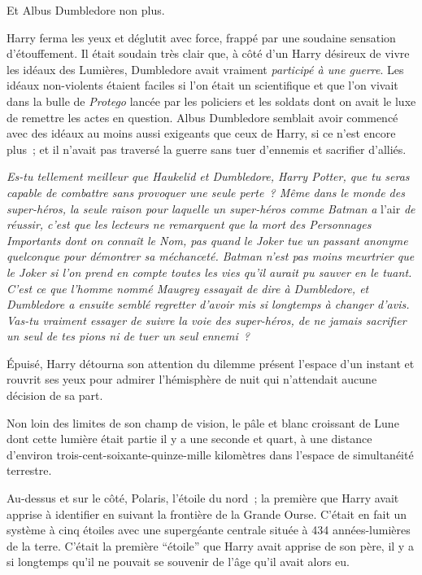 Et Albus Dumbledore non plus.

Harry ferma les yeux et déglutit avec force, frappé par une soudaine sensation d'étouffement. Il était soudain très clair que, à côté d'un Harry désireux de vivre les idéaux des Lumières, Dumbledore avait vraiment \emph{participé à une guerre}. Les idéaux non-violents étaient faciles si l'on était un scientifique et que l'on vivait dans la bulle de \emph{Protego} lancée par les policiers et les soldats dont on avait le luxe de remettre les actes en question. Albus Dumbledore semblait avoir commencé avec des idéaux au moins aussi exigeants que ceux de Harry, si ce n'est encore plus~; et il n'avait pas traversé la guerre sans tuer d'ennemis et sacrifier d'alliés.

\emph{Es-tu tellement meilleur que Haukelid et Dumbledore, Harry Potter, que tu seras capable de combattre sans provoquer une seule perte~? Même dans le monde des super-héros, la seule raison pour laquelle un super-héros comme Batman a} l'air \emph{de réussir, c'est que les lecteurs ne remarquent que la mort des Personnages Importants dont on connaît le Nom, pas quand le Joker tue un passant anonyme quelconque pour démontrer sa méchanceté. Batman n'est pas moins meurtrier que le Joker si l'on prend en compte toutes les vies qu'il aurait pu sauver en le tuant. C'est ce que l'homme nommé Maugrey essayait de dire à Dumbledore, et Dumbledore a ensuite semblé regretter d'avoir mis si longtemps à changer d'avis. Vas-tu vraiment essayer de suivre la voie des super-héros, de ne jamais sacrifier un seul de tes pions ni de tuer un seul ennemi~?}

Épuisé, Harry détourna son attention du dilemme présent l'espace d'un instant et rouvrit ses yeux pour admirer l'hémisphère de nuit qui n'attendait aucune décision de sa part.

Non loin des limites de son champ de vision, le pâle et blanc croissant de Lune dont cette lumière était partie il y a une seconde et quart, à une distance d'environ trois-cent-soixante-quinze-mille kilomètres dans l'espace de simultanéité terrestre.

Au-dessus et sur le côté, Polaris, l'étoile du nord~; la première que Harry avait apprise à identifier en suivant la frontière de la Grande Ourse. C'était en fait un système à cinq étoiles avec une supergéante centrale située à 434 années-lumières de la terre. C'était la première “étoile” que Harry avait apprise de son père, il y a si longtemps qu'il ne pouvait se souvenir de l'âge qu'il avait alors eu.

